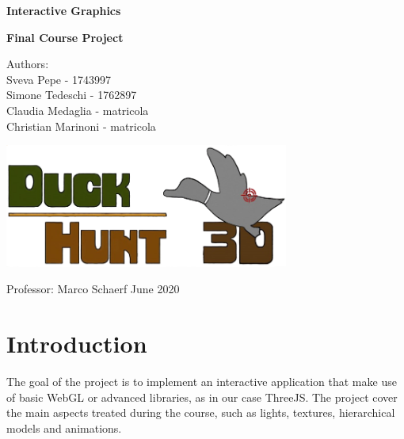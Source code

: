 \documentclass[12pt,a4paper]{article}
\begin{document}
	
\begin{titlepage}
	\begin{center}
		\vspace*{1cm}
		
		\LARGE
		\textbf{Interactive Graphics}
		
		\large 
		\textbf{Final Course Project}
		
		\vspace{1.5cm}
		Authors: \\
		Sveva Pepe - 1743997 \\ 
		Simone Tedeschi - 1762897 \\
		Claudia Medaglia - matricola \\
		Christian Marinoni - matricola
		\vfill
		
		\includegraphics[width=0.7\textwidth]{logo}
	
		\vfill
		
		\large
		Professor: Marco Schaerf\break\break\break\break
		June 2020
		
	\end{center}
\end{titlepage}

\tableofcontents
\pagebreak
\section{Introduction}
The goal of the project is to implement an interactive application 
that make use of basic WebGL or advanced libraries, as in our case ThreeJS. The project 
cover the main aspects treated during the course, such as lights, textures, hierarchical models and animations.
\end{document}
